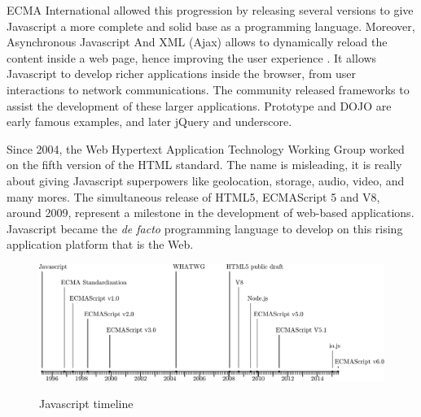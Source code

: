 ECMA International allowed this progression by releasing several versions to give Javascript a more complete and solid base as a programming language.
Moreover, %
Asynchronous Javascript And XML (Ajax) allows to dynamically reload the content inside a web page, hence improving the user experience \cite{Garrett2005}.
It allows Javascript to develop richer applications inside the browser, from user interactions to network communications.
The community released frameworks to assist the development of these larger applications.
Prototype and DOJO are early famous examples, and later jQuery and underscore.


Since 2004, the Web Hypertext Application Technology Working Group worked on the fifth version of the HTML standard.
The name is misleading, it is really about giving Javascript superpowers like geolocation, storage, audio, video, and many mores.
The simultaneous release of HTML5, ECMAScript 5 and V8, around 2009, represent a milestone in the development of web-based applications.
Javascript became the \textit{de facto} programming language to develop on this rising application platform that is the Web.

\begin{figure}
  \centering
  \includegraphics[width=\linewidth]{../resources/javascript-timeline.pdf}
  \label{fig:js-timeline}
  \caption{Javascript timeline}
\end{figure}


